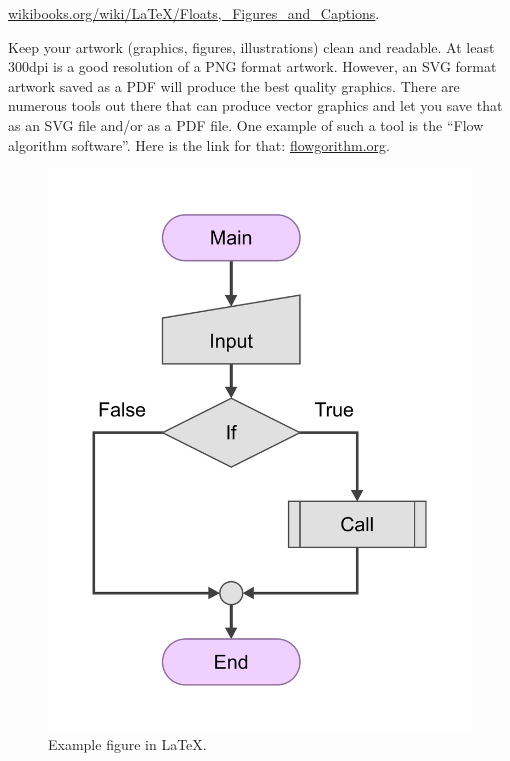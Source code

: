 \href{https://en.wikibooks.org/wiki/LaTeX/Floats,_Figures_and_Captions}{wikibooks.org/wiki/LaTeX/Floats,\_Figures\_and\_Captions}.

\noindent
Keep your artwork (graphics, figures, illustrations) clean and readable. At least 300dpi is a good resolution of a PNG format artwork. However, an SVG format artwork saved as a PDF will produce the best quality graphics. There are numerous tools out there that can produce vector graphics and let you save that as an SVG file and/or as a PDF file. One example of such a tool is the ``Flow algorithm software''. Here is the link for that: \href{http://www.flowgorithm.org/download/}{flowgorithm.org}.
\begin{figure}[ht]
    \centering
    \includegraphics[scale=0.3]{figures/chart.pdf}
    \caption{Example figure in \LaTeX.}
    \label{fig:chart_a}
\end{figure}

\clearpage %

